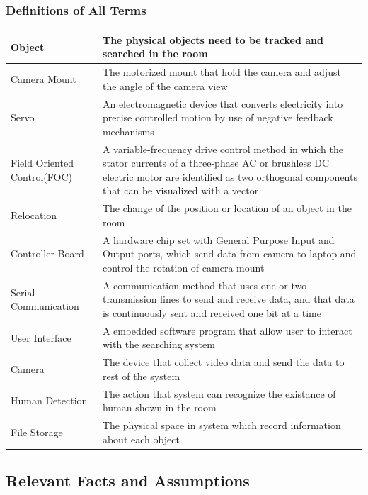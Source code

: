 \documentclass[12pt]{article}
\begin{document}
	\subsubsection{Definitions of All Terms}
		\begin{center}
    		\begin{tabular}{|| p{3cm} || p{8cm} ||}
   			 	\hline
    			Object& The physical objects need to be tracked and searched in the room  \\
   				\hline
    			Camera Mount & The motorized mount that hold the camera and adjust the angle of the camera view \\
    			\hline
   				 Servo  & An electromagnetic device that converts electricity into precise controlled motion by use of negative feedback mechanisms\\
    			\hline
   			 Field Oriented Control(FOC) & A variable-frequency drive control method in which the stator currents of a three-phase AC or brushless DC electric motor are identified as two orthogonal components that can be visualized with a vector\\
    			\hline
    			Relocation & The change of the position or location of an object in the room\\
    			\hline
   				Controller Board & A hardware chip set with General Purpose Input and Output ports, which send data from camera to laptop and control the rotation of camera mount\\
   				\hline
   				Serial Communication & A communication method that uses one or two transmission lines to send and receive data, and that data is continuously sent and received one bit at a time\\
   				\hline
   				User Interface & A embedded software program that allow user to interact with the searching system\\
   				\hline
   				Camera & The device that collect video data and send the data to rest of the system\\
   				\hline 
   				Human Detection & The action that system can recognize the existance of human shown in the room\\
   				\hline
   				File Storage & The physical space in system which record information about each object\\
    \hline\hline
    \end{tabular}
\end{center}
	



\subsection{Relevant Facts and Assumptions}
\end{document}
